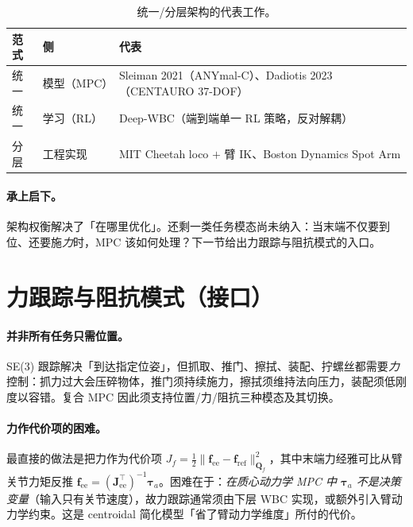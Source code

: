 \begin{table}[H]\centering\small
\caption{统一/分层架构的代表工作。}
\label{tab:umm-rep}
\begin{tabular}{lll}
\toprule
范式 & 侧 & 代表 \\
\midrule
统一 & 模型（MPC） & Sleiman 2021（ANYmal-C）、Dadiotis 2023（CENTAURO 37-DOF） \\
统一 & 学习（RL） & Deep-WBC（端到端单一 RL 策略，反对解耦） \\
分层 & 工程实现 & MIT Cheetah loco $+$ 臂 IK、Boston Dynamics Spot Arm \\
\bottomrule
\end{tabular}
\end{table}

\paragraph{承上启下。}
架构权衡解决了「在哪里优化」。还剩一类任务模态尚未纳入：当末端不仅要到位、还要施\emph{力}时，MPC 该如何处理？下一节给出力跟踪与阻抗模式的入口。

\section{力跟踪与阻抗模式（接口）}
\label{sec:umm-force}

\paragraph{并非所有任务只需位置。}
SE(3) 跟踪解决「到达指定位姿」，但抓取、推门、擦拭、装配、拧螺丝都需要\emph{力}控制：抓力过大会压碎物体，推门须持续施力，擦拭须维持法向压力，装配须低刚度以容错。复合 MPC 因此须支持位置/力/阻抗三种模态及其切换。

\paragraph{力作代价项的困难。}
最直接的做法是把力作为代价项 $J_f=\tfrac12\|\mathbf f_{\text{ee}}-\mathbf f_{\text{ref}}\|_{\mathbf Q_f}^2$，其中末端力经雅可比从臂关节力矩反推 $\mathbf f_{\text{ee}}=(\mathbf J_{\text{ee}}^\top)^{-1}\boldsymbol\tau_a$。困难在于：\emph{在质心动力学 MPC 中 $\boldsymbol\tau_a$ 不是决策变量}（输入只有关节速度），故力跟踪通常须由下层 WBC 实现，或额外引入臂动力学约束。这是 centroidal 简化模型「省了臂动力学维度」所付的代价。


